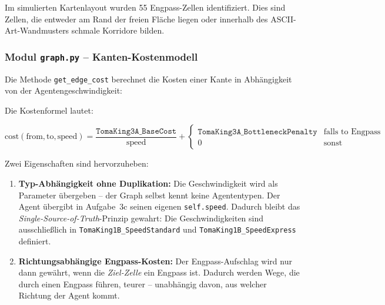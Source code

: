Im simulierten Kartenlayout wurden 55 Engpass-Zellen identifiziert. Dies sind Zellen, die entweder am Rand der freien Fläche liegen oder innerhalb des \acs{ASCII}-Art-Wandmusters schmale Korridore bilden.


\subsubsection{Modul \texttt{graph.py} – Kanten-Kostenmodell}
\label{sssec:graph_edge_cost_3a}

Die Methode \texttt{get\_edge\_cost} berechnet die Kosten einer Kante in Abhängigkeit von der Agentengeschwindigkeit:



Die Kostenformel lautet:
\begin{center}
\footnotesize
\[
\text{cost}(\text{from}, \text{to}, \text{speed}) =
\frac{\texttt{TomaKing3A\_BaseCost}}{\text{speed}} +
\begin{cases}
\texttt{TomaKing3A\_BottleneckPenalty} & \text{falls } \text{to} \text{ Engpass} \\
0 & \text{sonst}
\end{cases}
\]
\end{center}

Zwei Eigenschaften sind hervorzuheben:
\begin{enumerate}
    \item \textbf{Typ-Abhängigkeit ohne Duplikation:} Die Geschwindigkeit wird als Parameter übergeben -- der Graph selbst kennt keine Agententypen. Der Agent übergibt in Aufgabe~3c seinen eigenen \texttt{self.speed}. Dadurch bleibt das \textit{Single-Source-of-Truth}-Prinzip gewahrt: Die Geschwindigkeiten sind ausschließlich in \texttt{TomaKing1B\_SpeedStandard} und \texttt{TomaKing1B\_SpeedExpress} definiert.
    \item \textbf{Richtungsabhängige Engpass-Kosten:} Der Engpass-Aufschlag wird nur dann gewährt, wenn die \textit{Ziel-Zelle} ein Engpass ist. Dadurch werden Wege, die durch einen Engpass führen, teurer -- unabhängig davon, aus welcher Richtung der Agent kommt.
\end{enumerate}


